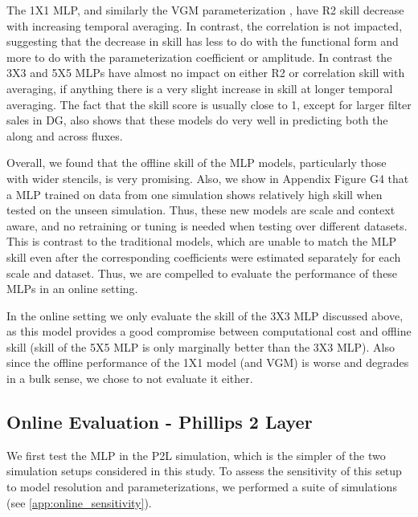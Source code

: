 \documentclass[draft]{agujournal2019}
\begin{document}
The 1X1 MLP, and similarly the VGM parameterization \cite{khani2023gradient}, have R2 skill decrease with increasing temporal averaging. In contrast, the correlation is not impacted, suggesting that the decrease in skill has less to do with the functional form and more to do with the parameterization coefficient or amplitude.  
In contrast the 3X3 and 5X5 MLPs have almost no impact on either R2 or correlation skill with averaging, if anything there is a very slight increase in skill at longer temporal averaging. The fact that the skill score is usually close to 1, except for larger filter sales in DG, also shows that these models do very well in predicting both the along and across fluxes. 

Overall, we found that the offline skill of the MLP models, particularly those with wider stencils, is very promising. Also, we show in Appendix Figure G4 that a MLP trained on data from one simulation shows relatively high skill when tested on the unseen simulation. Thus, these new models are scale and context aware, and no retraining or tuning is needed when testing over different datasets. This is contrast to the traditional models, which are unable to match the MLP skill even after the corresponding coefficients were estimated separately for each scale and dataset. 
Thus, we are compelled to evaluate the performance of these MLPs in an online setting. 

In the online setting we only evaluate the skill of the 3X3 MLP discussed above, as this model provides a good compromise between computational cost and offline skill (skill of the 5X5 MLP is only marginally better than the 3X3 MLP). Also since the offline performance of the 1X1 model (and VGM) is worse and degrades in a bulk sense, we chose to not evaluate it either.

\subsection{Online Evaluation - Phillips 2 Layer}
We first test the MLP in the P2L simulation, which is the simpler of the two simulation setups considered in this study. To assess the sensitivity of this setup to model resolution and parameterizations, we performed a suite of simulations (see \ref{app:online_sensitivity}).
\end{document}
